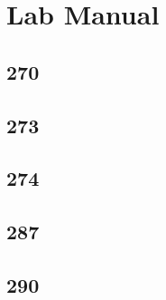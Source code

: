 \documentclass{article}
\begin{document}
\section{Lab Manual}

\subsection{270}

\subsection{273}

\subsection{274}

\subsection{287}

\subsection{290}
\end{document}
